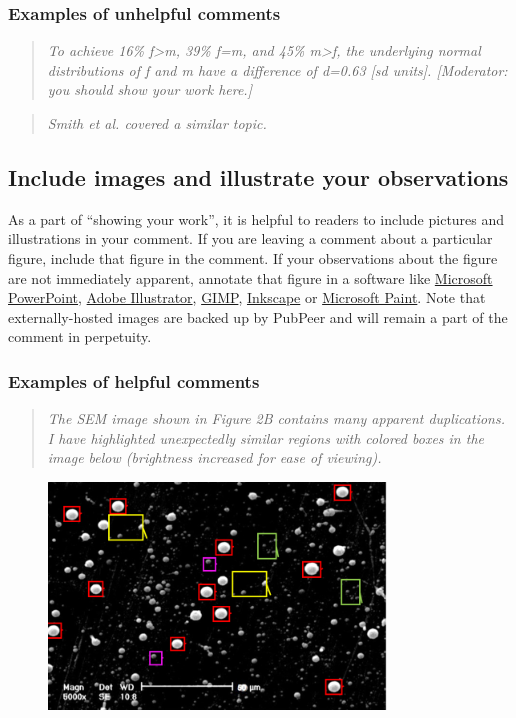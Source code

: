 \documentclass[letterpaper, 12pt]{article}
\begin{document}
\subsubsection*{Examples of unhelpful comments}

\begin{quote}
    \textit{To achieve 16\% f>m, 39\% f=m, and 45\% m>f, the underlying normal distributions of f and m have a difference of d=0.63 [sd units]. [Moderator: you should show your work here.]}
\end{quote}

\begin{quote}
    \textit{Smith et al. covered a similar topic.}
\end{quote}

\subsection*{Include images and illustrate your observations}

As a part of ``showing your work'', it is helpful to readers to include pictures and illustrations in your comment. If you are leaving a comment about a particular figure, include that figure in the comment. If your observations about the figure are not immediately apparent, annotate that figure in a software like \href{https://www.microsoft.com/en-us/microsoft-365/powerpoint}{Microsoft PowerPoint}, \href{https://www.adobe.com/products/illustrator.html}{Adobe Illustrator}, \href{https://www.gimp.org/}{GIMP}, \href{https://inkscape.org/}{Inkscape} or \href{https://www.microsoft.com/en-us/windows/paint}{Microsoft Paint}. Note that externally-hosted images are backed up by PubPeer and will remain a part of the comment in perpetuity.

\subsubsection*{Examples of helpful comments}

\begin{quote}
    \textit{The SEM image shown in Figure 2B contains many apparent duplications. I have highlighted unexpectedly similar regions with colored boxes in the image below (brightness increased for ease of viewing).}
\end{quote}

\begin{figure}[h!tbp]
\centering
    \includegraphics[width=0.8\textwidth]{img/pubpeer/pubpeer_dupes.PNG}
\end{figure}
\end{document}
